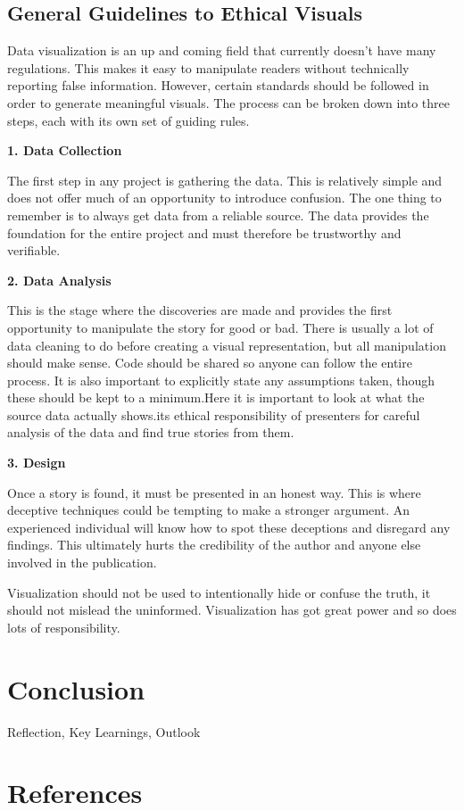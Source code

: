 \documentclass[]{book}
\theoremstyle{definition}
\theoremstyle{definition}
\theoremstyle{definition}
\theoremstyle{remark}
\begin{document}
\section{General Guidelines to Ethical
Visuals}\label{general-guidelines-to-ethical-visuals}

\citep{ethics_code}

Data visualization is an up and coming field that currently doesn't have
many regulations. This makes it easy to manipulate readers without
technically reporting false information. However, certain standards
should be followed in order to generate meaningful visuals. The process
can be broken down into three steps, each with its own set of guiding
rules.

\textbf{1. Data Collection}

The first step in any project is gathering the data. This is relatively
simple and does not offer much of an opportunity to introduce confusion.
The one thing to remember is to always get data from a reliable source.
The data provides the foundation for the entire project and must
therefore be trustworthy and verifiable.

\textbf{2. Data Analysis}

This is the stage where the discoveries are made and provides the first
opportunity to manipulate the story for good or bad. There is usually a
lot of data cleaning to do before creating a visual representation, but
all manipulation should make sense. Code should be shared so anyone can
follow the entire process. It is also important to explicitly state any
assumptions taken, though these should be kept to a minimum.Here it is
important to look at what the source data actually shows.its ethical
responsibility of presenters for careful analysis of the data and find
true stories from them.

\textbf{3. Design}

Once a story is found, it must be presented in an honest way. This is
where deceptive techniques could be tempting to make a stronger
argument. An experienced individual will know how to spot these
deceptions and disregard any findings. This ultimately hurts the
credibility of the author and anyone else involved in the publication.

Visualization should not be used to intentionally hide or confuse the
truth, it should not mislead the uninformed. Visualization has got great
power and so does lots of responsibility.

\chapter{Conclusion}\label{conclusion}

Reflection, Key Learnings, Outlook

\chapter*{References}\label{references-1}


\end{document}
